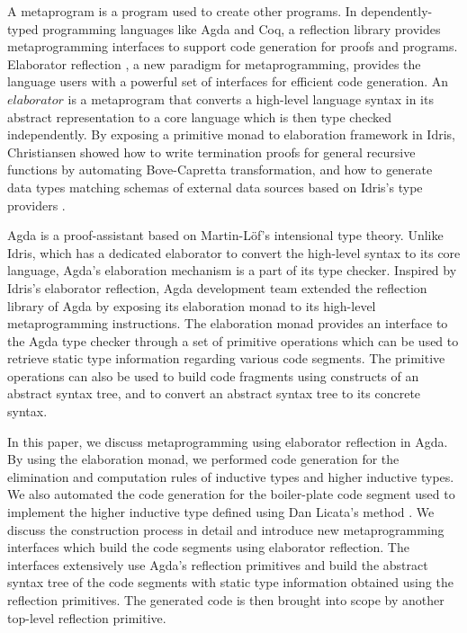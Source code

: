 \documentclass[sigplan,10pt]{acmart}
\begin{document}
A metaprogram is a program used to create other programs. In dependently-typed programming languages like Agda and Coq, a reflection library provides metaprogramming interfaces to support code generation for proofs and programs. Elaborator reflection \cite{David-2016}, a new paradigm for metaprogramming, provides the language users with a powerful set of interfaces for efficient code generation. An $elaborator$ is a metaprogram that converts a high-level language syntax in its abstract representation to a core language which is then type checked independently. By exposing a primitive monad to elaboration framework in Idris, Christiansen \cite{David-2016} showed how to write termination proofs for general recursive functions by automating Bove-Capretta \cite{Bove-2005} transformation, and how to generate data types matching schemas of external data sources based on Idris’s type providers \cite{David-2013}.

Agda is a proof-assistant based on Martin-Löf’s intensional type theory. Unlike Idris, which has a dedicated elaborator to convert the high-level syntax to its core language, Agda’s elaboration mechanism is a part of its type checker. Inspired by Idris’s elaborator reflection, Agda development team extended the reflection library of Agda by exposing its elaboration monad to its high-level metaprogramming instructions. The elaboration monad provides an interface to the Agda type checker through a set of primitive operations which can be used to retrieve static type information regarding various code segments. The primitive operations can also be used to build code fragments using constructs of an abstract syntax tree, and to convert an abstract syntax tree to its concrete syntax.

In this paper, we discuss metaprogramming using elaborator reflection in Agda. By using the elaboration monad, we performed code generation for the elimination and computation rules of inductive types and higher inductive types. We also automated the code generation for the boiler-plate code segment used to implement the higher inductive type defined using Dan Licata's method \cite{Licata-2011}. We discuss the construction process in detail and introduce new metaprogramming interfaces which build the code segments using elaborator reflection. The interfaces extensively use Agda’s reflection primitives and build the abstract syntax tree of the code segments with static type information obtained using the reflection primitives. The generated code is then brought into scope by another top-level reflection primitive.
\end{document}
